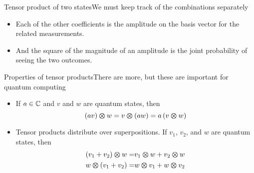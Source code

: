 \begin{frame}{Tensor product of two states}{We must keep track of the combinations separately}
{{\begin{itemize}
    \item Each of the other coefficients is the amplitude on the basis vector for the related measurements.
    \item And the square of the magnitude of an amplitude is the joint probability of seeing the two outcomes.
\end{itemize}
}
}{%
}
\end{frame}

\begin{frame}{Properties of tensor products}{There are more, but these are important for quantum computing}
\begin{itemize}
    \item If $a \in \mathbb{C}$ and $v$ and $w$ are quantum states, then
    \[ 
       (av) \bm{\otimes}{} w = v \bm{\otimes}{} (aw) = a\,(v \bm{\otimes}{} w)
    \]
    \item Tensor products distribute over superpositions.  If $v_{1}$, $v_{2}$, and $w$ are quantum states, then
    \begin{align*}
       (v_{1}+v_{2}) \bm{\otimes}{} w = & v_{1} \bm{\otimes}{} w + v_{2} \bm{\otimes}{} w \\
       w \bm{\otimes}{} (v_{1}+v_{2}) = & w \bm{\otimes}{} v_{1} + w \bm{\otimes}{} v_{2}
    \end{align*}
\end{itemize}
\end{frame}


